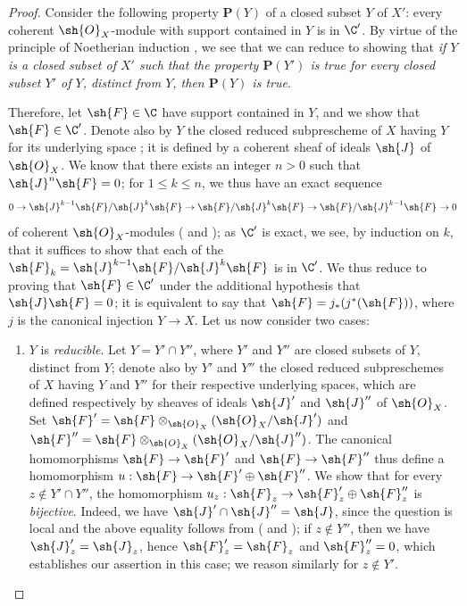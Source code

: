 \begin{proof}
Consider the following property $\textbf{P}(Y)$ of a closed subset $Y$ of $X'$: every coherent $\sh{O}_X$-module with support contained in $Y$ is in $\C'$.
By virtue of the principle of Noetherian induction , we see that we can reduce to showing that \emph{if $Y$ is a closed subset of $X'$ such that the property $\textbf{P}(Y')$ is true for every closed subset $Y'$ of $Y$, distinct from $Y$, then $\textbf{P}(Y)$ is true}.

Therefore, let $\sh{F}\in\C$ have support contained in $Y$, and we show that $\sh{F}\in\C'$.
Denote also by $Y$ the closed reduced subprescheme of $X$ having $Y$ for its underlying space ; it is defined by a coherent sheaf of ideals $\sh{J}$ of $\sh{O}_X$.
We know  that there exists an integer $n>0$ such that $\sh{J}^n\sh{F}=0$; for $1\leq k\leq n$, we thus have an exact sequence
\[
  0\to\sh{J}^{k-1}\sh{F}/\sh{J}^k\sh{F}\to\sh{F}/\sh{J}^k\sh{F}\to\sh{F}/\sh{J}^{k-1}\sh{F}\to 0
\]
 of coherent $\sh{O}_X$-modules ( and ); as $\C'$ is exact, we see, by induction on $k$, that it suffices to show that each of the $\sh{F}_k=\sh{J}^{k-1}\sh{F}/\sh{J}^k\sh{F}$ is in $\C'$.
We thus reduce to proving that $\sh{F}\in\C'$ under the additional hypothesis that $\sh{J}\sh{F}=0$; it is equivalent to say that $\sh{F}=j_*(j^*(\sh{F}))$, where $j$ is the canonical injection $Y\to X$.
Let us now consider two cases:
\begin{enumerate}
  \item[(a)] $Y$ is \emph{reducible}.
    Let $Y=Y'\cap Y''$, where $Y'$ and $Y''$ are closed subsets of $Y$, distinct from $Y$; denote also by $Y'$ and $Y''$ the closed reduced subpreschemes of $X$ having $Y$ and $Y''$ for their respective underlying spaces, which are defined respectively by sheaves of ideals $\sh{J}'$ and $\sh{J}''$ of $\sh{O}_X$.
    Set $\sh{F}'=\sh{F}\otimes_{\sh{O}_X}(\sh{O}_X/\sh{J}')$ and $\sh{F}''=\sh{F}\otimes_{\sh{O}_X}(\sh{O}_X/\sh{J}'')$.
    The canonical homomorphisms $\sh{F}\to\sh{F}'$ and $\sh{F}\to\sh{F}''$ thus define a homomorphism $u:\sh{F}\to\sh{F}'\oplus\sh{F}''$.
    We show that for every $z\not\in Y'\cap Y''$, the homomorphism $u_z:\sh{F}_z\to\sh{F}_z'\oplus\sh{F}_z''$ is \emph{bijective}.
    Indeed, we have $\sh{J}'\cap\sh{J}''=\sh{J}$, since the question is local and
    the above equality follows from ( and ); if $z\not\in Y''$, then we have $\sh{J}_z'=\sh{J}_z$, hence $\sh{F}_z'=\sh{F}_z$ and $\sh{F}_z''=0$, which establishes our assertion in this case; we reason similarly for $z\not\in Y'$.

\end{enumerate}
\end{proof}
